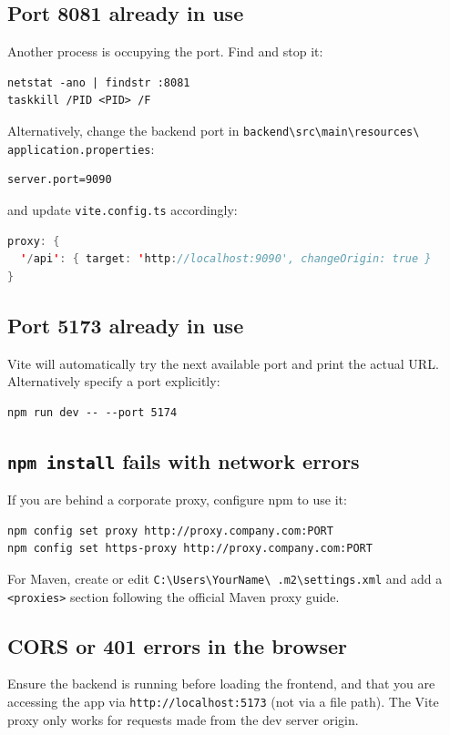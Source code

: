\documentclass[12pt,a4paper]{article}
\begin{document}
\subsection{Port 8081 already in use}
Another process is occupying the port.  Find and stop it:
\begin{lstlisting}
netstat -ano | findstr :8081
taskkill /PID <PID> /F
\end{lstlisting}
Alternatively, change the backend port in
\texttt{backend\textbackslash src\textbackslash main\textbackslash resources\textbackslash
application.properties}:
\begin{lstlisting}
server.port=9090
\end{lstlisting}
and update \texttt{vite.config.ts} accordingly:
\begin{lstlisting}[language=Java]
proxy: {
  '/api': { target: 'http://localhost:9090', changeOrigin: true }
}
\end{lstlisting}

\subsection{Port 5173 already in use}
Vite will automatically try the next available port and print the actual URL.
Alternatively specify a port explicitly:
\begin{lstlisting}
npm run dev -- --port 5174
\end{lstlisting}

\subsection{\texttt{npm install} fails with network errors}
If you are behind a corporate proxy, configure npm to use it:
\begin{lstlisting}
npm config set proxy http://proxy.company.com:PORT
npm config set https-proxy http://proxy.company.com:PORT
\end{lstlisting}
For Maven, create or edit
\texttt{C:\textbackslash Users\textbackslash YourName\textbackslash
.m2\textbackslash settings.xml} and add a \texttt{<proxies>} section
following the official Maven proxy guide.

\subsection{CORS or 401 errors in the browser}
Ensure the backend is running before loading the frontend, and that you are
accessing the app via \texttt{http://localhost:5173} (not via a file path).
The Vite proxy only works for requests made from the dev server origin.
\end{document}
